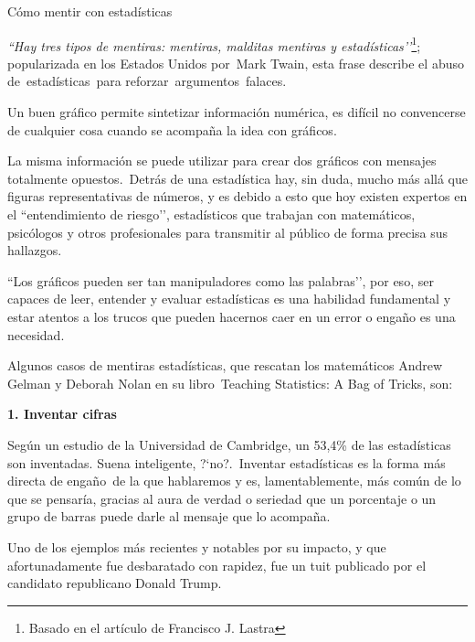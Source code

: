 \begin{myexampleblock}{Cómo mentir con estadísticas}

\emph{``Hay tres tipos de mentiras: mentiras, malditas mentiras y estadísticas’’}\footnote{Basado en el artículo de Francisco J. Lastra}; popularizada en los Estados Unidos por Mark Twain, esta frase describe el abuso de estadísticas para reforzar argumentos falaces.

\vspace{2mm} Un buen gráfico permite sintetizar información numérica, es difícil no convencerse de cualquier cosa cuando se acompaña la idea con gráficos. 

\vspace{2mm} La misma información se puede utilizar para crear dos gráficos con mensajes totalmente opuestos. Detrás de una estadística hay, sin duda, mucho más allá que figuras representativas de números, y es debido a esto que hoy existen expertos en el ``entendimiento de riesgo’’, estadísticos que trabajan con matemáticos, psicólogos y otros profesionales para transmitir al público de forma precisa sus hallazgos.

\vspace{2mm} ``Los gráficos pueden ser tan manipuladores como las palabras’’, por eso, ser capaces de leer, entender y evaluar estadísticas es una habilidad fundamental y estar atentos a los trucos que pueden hacernos caer en un error o engaño es una necesidad.

\vspace{2mm} Algunos casos de mentiras estadísticas, que rescatan los matemáticos Andrew Gelman y Deborah Nolan en su libro Teaching Statistics: A Bag of Tricks, son:

\vspace{2mm} \textbf{1. Inventar cifras}

\vspace{2mm} Según un estudio de la Universidad de Cambridge, un 53,4\% de las estadísticas son inventadas. Suena inteligente, ?`no?. Inventar estadísticas es la forma más directa de engaño de la que hablaremos y es, lamentablemente, más común de lo que se pensaría, gracias al aura de verdad o seriedad que un porcentaje o un grupo de barras puede darle al mensaje que lo acompaña.

\vspace{2mm} Uno de los ejemplos más recientes y notables por su impacto, y que afortunadamente fue desbaratado con rapidez, fue un tuit publicado por el candidato republicano Donald Trump.


\end{myexampleblock}
